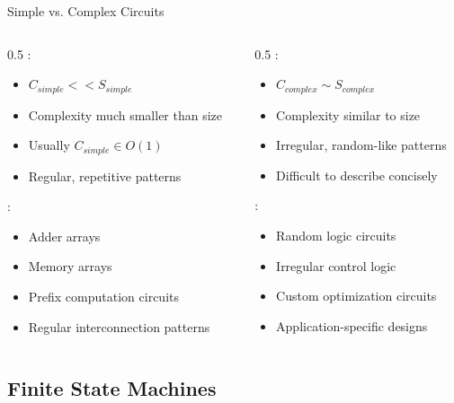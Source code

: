 \begin{frame}{Simple vs. Complex Circuits}
\begin{columns}
\begin{column}{0.5\textwidth}
:
\begin{itemize}
\item $C_{simple} << S_{simple}$
\item Complexity much smaller than size
\item Usually $C_{simple} \in O(1)$
\item Regular, repetitive patterns
\end{itemize}

\vspace{0.3cm}
:
\begin{itemize}
\item Adder arrays
\item Memory arrays
\item Prefix computation circuits
\item Regular interconnection patterns
\end{itemize}
\end{column}
\begin{column}{0.5\textwidth}
:
\begin{itemize}
\item $C_{complex} \sim S_{complex}$
\item Complexity similar to size
\item Irregular, random-like patterns
\item Difficult to describe concisely
\end{itemize}

\vspace{0.3cm}
:
\begin{itemize}
\item Random logic circuits
\item Irregular control logic
\item Custom optimization circuits
\item Application-specific designs
\end{itemize}
\end{column}
\end{columns}
\end{frame}

\subsection{Finite State Machines}

